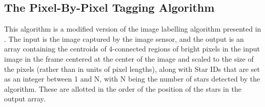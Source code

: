 \subsection{The Pixel-By-Pixel Tagging Algorithm}

This algorithm is a modified version of the image labelling algorithm presented in \cite{imglabelseq}. The input is the image captured by the image sensor, and the output is an array containing the centroids of 4-connected regions of bright pixels in the input image in the frame centered at the center of the image and scaled to the size of the pixels (rather than in units of pixel lengths), along with Star IDs that are set as an integer between 1 and N, with N being the number of stars detected by the algorithm. These are allotted in the order of the position of the stars in the output array.

